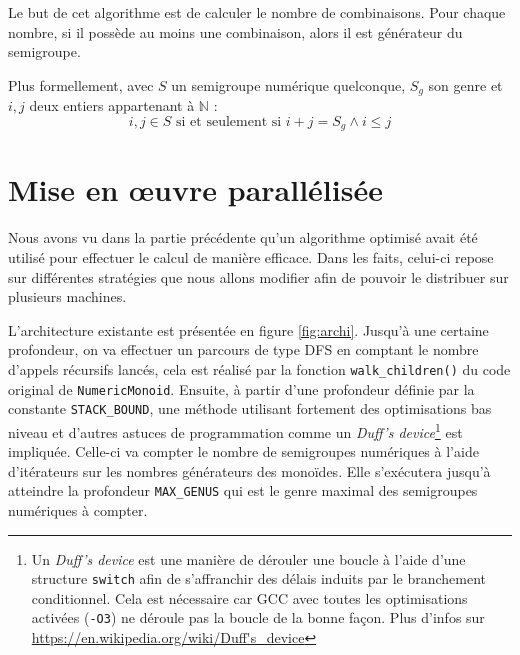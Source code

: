 \documentclass[12pt,a4paper]{report}
\let\leq\leqslant
\begin{document}
Le but de cet algorithme est de calculer le nombre de combinaisons. Pour chaque nombre, si il possède au moins une combinaison, alors il est générateur du semigroupe.

Plus formellement, avec $S$ un semigroupe numérique quelconque, $S_g$ son genre et $i, j$ deux entiers appartenant à $\mathbb{N}$ :
\[ i, j \in S \text{ si et seulement si } i + j = S_g \land i \leq j \]

\section{Mise en \oe{}uvre parallélisée}
Nous avons vu dans la partie précédente qu'un algorithme optimisé avait été utilisé pour effectuer le calcul de manière efficace. Dans les faits, celui-ci repose sur différentes stratégies que nous allons modifier afin de pouvoir le distribuer sur plusieurs machines.

L'architecture existante est présentée en figure \ref{fig:archi}. Jusqu'à une certaine profondeur, on va effectuer un parcours de type DFS en comptant le nombre d'appels récursifs lancés, cela est réalisé par la fonction \texttt{walk\_children()} du code original de \texttt{NumericMonoid}. Ensuite, à partir d'une profondeur définie par la constante \texttt{STACK\_BOUND}, une méthode utilisant fortement des optimisations bas niveau et d'autres astuces de programmation comme un \emph{Duff's device}\footnote{Un \emph{Duff's device} est une manière de dérouler une boucle à l'aide d'une structure \texttt{switch} afin de s'affranchir des délais induits par le branchement conditionnel. Cela est nécessaire car GCC avec toutes les optimisations activées (\texttt{-O3}) ne déroule pas la boucle de la bonne façon. Plus d'infos sur \url{https://en.wikipedia.org/wiki/Duff's_device}} est impliquée. Celle-ci va compter le nombre de semigroupes numériques à l'aide d'itérateurs sur les nombres générateurs des monoïdes. Elle s'exécutera jusqu'à atteindre la profondeur \texttt{MAX\_GENUS} qui est le genre maximal des semigroupes numériques à compter.
\end{document}
